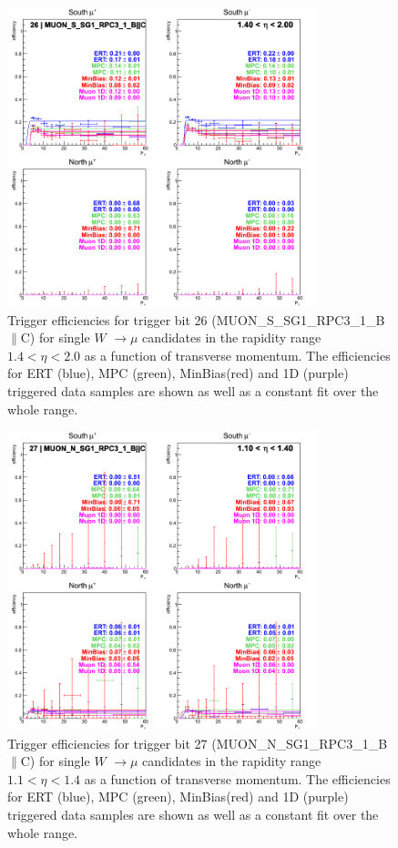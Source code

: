 \begin{figure}[ht]
\begin{center}
\includegraphics[width=0.8\textwidth]{./figures/run13_trigeffipt_eta1_trig26_lin.png}
\caption{\label{fig:run13_trigeffipt_eta1_nper0_trig26_lin} Trigger efficiencies for trigger bit 26 (MUON\_S\_SG1\_RPC3\_1\_B$\|$C) for single $W$ $\rightarrow \mu$ candidates in the rapidity range $ 1.4 < \eta < 2.0$ as a function of transverse momentum. The efficiencies for ERT (blue), MPC (green), MinBias(red) and 1D (purple) triggered data samples are shown as well as a constant fit over the whole range.}
\end{center}
\end{figure}
\begin{figure}[ht]
\begin{center}
\includegraphics[width=0.8\textwidth]{./figures/run13_trigeffipt_eta0_trig27_lin.png}
\caption{\label{fig:run13_trigeffipt_eta0_nper0_trig27_lin} Trigger efficiencies for trigger bit 27 (MUON\_N\_SG1\_RPC3\_1\_B$\|$C) for single $W$ $\rightarrow \mu$ candidates in the rapidity range $ 1.1 < \eta < 1.4$ as a function of transverse momentum. The efficiencies for ERT (blue), MPC (green), MinBias(red) and 1D (purple) triggered data samples are shown as well as a constant fit over the whole range.}
\end{center}
\end{figure}
